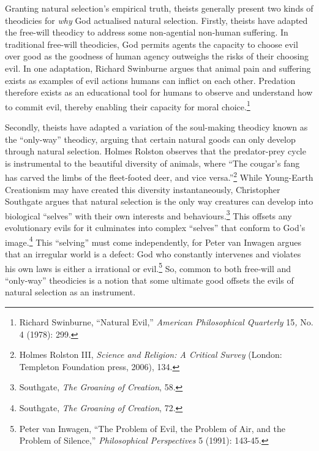 Granting natural selection's empirical truth, theists generally present
two kinds of theodicies for \emph{why} God actualised natural selection.
Firstly, theists have adapted the free-will theodicy to address some
non-agential non-human suffering. In traditional free-will theodicies,
God permits agents the capacity to choose evil over good as the goodness
of human agency outweighs the risks of their choosing evil. In one
adaptation, Richard Swinburne argues that animal pain and suffering
exists as examples of evil actions humans can inflict on each other.
Predation therefore exists as an educational tool for humans to observe
and understand how to commit evil, thereby enabling their capacity for
moral choice.\footnote{Richard Swinburne, ``Natural Evil,''
  \emph{American Philosophical Quarterly} 15\emph{,} No. 4 (1978): 299.}

Secondly, theists have adapted a variation of the soul-making theodicy
known as the ``only-way'' theodicy, arguing that certain natural goods
can only develop through natural selection. Holmes Rolston observes that
the predator-prey cycle is instrumental to the beautiful diversity of
animals, where ``The cougar's fang has carved the limbs of the
fleet-footed deer, and vice versa.''\footnote{Holmes Rolston III,
  \emph{Science and Religion: A Critical Survey} (London: Templeton
  Foundation press, 2006), 134.} While Young-Earth Creationism may have
created this diversity instantaneously, Christopher Southgate argues
that natural selection is the only way creatures can develop into
biological ``selves'' with their own interests and
behaviours.\footnote{Southgate, \emph{The Groaning of Creation}, 58.}
This offsets any evolutionary evils for it culminates into complex
``selves'' that conform to God's image.\footnote{Southgate, \emph{The Groaning of Creation}, 72.} This
``selving'' must come independently, for Peter van Inwagen argues that
an irregular world is a defect: God who constantly intervenes and
violates his own laws is either a irrational or evil.\footnote{Peter van
  Inwagen, ``The Problem of Evil, the Problem of Air, and the Problem of
  Silence,'' \emph{Philosophical Perspectives} 5 (1991): 143-45.} So,
common to both free-will and ``only-way'' theodicies is a notion that
some ultimate good offsets the evils of natural selection as an
instrument.


